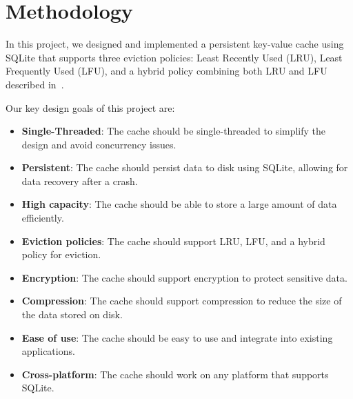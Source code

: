 
\section{Methodology}

In this project, we designed and implemented a
persistent key-value cache using SQLite
that supports three eviction policies: Least Recently Used (LRU),
Least Frequently Used (LFU), and a hybrid policy combining both LRU and LFU
described in~\cite{shah2023ImprovedCacheEviction}.


Our key design goals of this project are:
\begin{itemize}
    \item \textbf{Single-Threaded}: The cache should be single-threaded to simplify the design and avoid concurrency issues.
    \item \textbf{Persistent}: The cache should persist data to disk using SQLite, allowing for data recovery after a crash.
    \item \textbf{High capacity}: The cache should be able to store a large amount of data efficiently.
    \item \textbf{Eviction policies}: The cache should support LRU, LFU, and a hybrid policy for eviction.
    \item \textbf{Encryption}: The cache should support encryption to protect sensitive data.
    \item \textbf{Compression}: The cache should support compression to reduce the size of the data stored on disk.
    \item \textbf{Ease of use}: The cache should be easy to use and integrate into existing applications.
    \item \textbf{Cross-platform}: The cache should work on any platform that supports SQLite.
\end{itemize}

